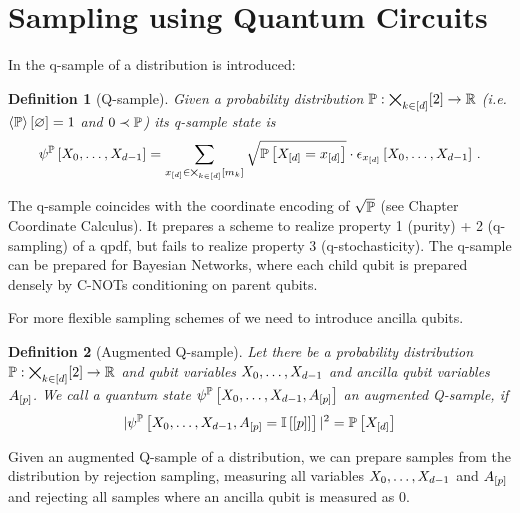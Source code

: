 \documentclass[aps,onecolumn,nofootinbib,pra]{article}
\newtheorem{definition}{Definition}
\begin{document}
    


    \section{Sampling using Quantum Circuits}

    In \cite{low_quantum_2014} the q-sample of a distribution is introduced:

    \begin{definition}[Q-sample]
        Given a probability distribution $\mathbb{P}:\bigtimes_{k\in[d]}[2]\rightarrow\mathbb{R}$ (i.e. $\left\langle \mathbb{P}\right\rangle \left[ \varnothing \right]=1$ and $0 \prec \mathbb{P}$) its q-sample state is
        \begin{align*}
            \psi^{\mathbb{P}}\left[X_{0},\ldots,X_{d-1}\right]
            = \sum_{x_{[d]}\in\bigtimes_{k\in[d]}[m_{k}]} \sqrt{\mathbb{P}\left[X_{[d]}=x_{[d]}\right]} \cdot \epsilon_{x_{[d]}}\left[X_{0},\ldots,X_{d-1}\right] \, .
        \end{align*}
    \end{definition}

    The q-sample coincides with the coordinate encoding of $\sqrt{\mathbb{P}}$ (see Chapter Coordinate Calculus).
    It prepares a scheme to realize property 1 (purity) + 2 (q-sampling) of a qpdf, but fails to realize property 3 (q-stochasticity).
    The q-sample can be prepared for Bayesian Networks, where each child qubit is prepared densely by C-NOTs conditioning on parent qubits.

    For more flexible sampling schemes of \ComputationActivationNetworks{} we need to introduce ancilla qubits.

    \begin{definition}[Augmented Q-sample]\label{def:augmentedQsample}
        Let there be a probability distribution $\mathbb{P}:\bigtimes_{k\in[d]}[2]\rightarrow\mathbb{R}$ and qubit variables $X_{0},\ldots,X_{d-1}$ and ancilla qubit variables $A_{[p]}$.
        We call a quantum state $\psi^{\mathbb{P}}\left[X_{0},\ldots,X_{d-1},A_{[p]}\right]$ an augmented Q-sample, if
        \begin{align*}
             |\psi^{\mathbb{P}}\left[X_{0},\ldots,X_{d-1},A_{[p]}=\mathbb{I}\left[[p]\right]\right]|^2 = \mathbb{P}\left[X_{[d]}\right]
        \end{align*}
    \end{definition}

    Given an augmented Q-sample of a distribution, we can prepare samples from the distribution by rejection sampling, measuring all variables $X_{0},\ldots,X_{d-1}$ and $A_{[p]}$ and rejecting all samples where an ancilla qubit is measured as $0$.
\end{document}
